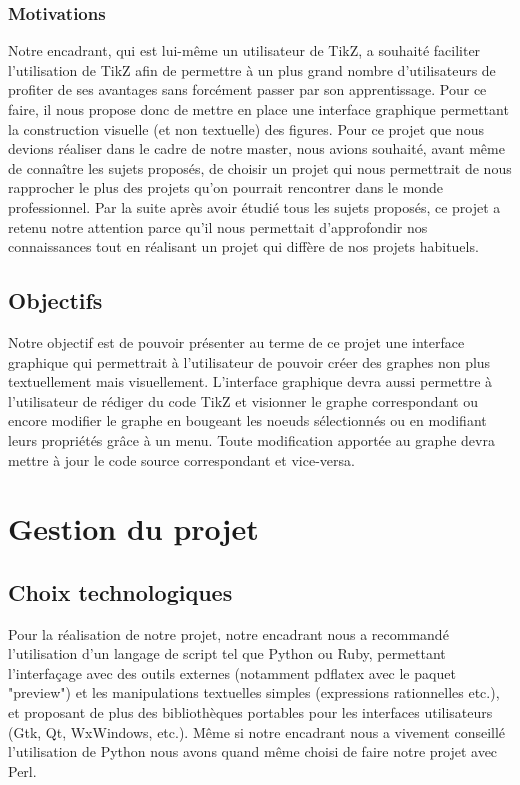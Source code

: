 \documentclass[a4paper]{report}
\begin{document}
  \subsection{Motivations}
  Notre encadrant, qui est lui-même un utilisateur de TikZ, a souhaité faciliter l'utilisation de TikZ afin de permettre à un plus grand nombre d'utilisateurs de profiter de ses avantages sans forcément passer par son apprentissage. Pour ce faire, il nous propose donc de mettre en place une interface graphique permettant la construction  visuelle (et non textuelle) des figures.
  \newline
  Pour ce projet que nous devions réaliser dans le cadre de notre master, nous avions souhaité, avant même de 
connaître les sujets proposés, de choisir un projet qui nous permettrait de nous rapprocher le plus des projets qu'on pourrait rencontrer dans le monde professionnel. Par la suite après avoir étudié tous les sujets proposés, ce projet a retenu notre attention parce qu'il nous permettait d'approfondir nos connaissances tout en réalisant un projet qui diffère de nos projets habituels.
  \section{Objectifs}
  Notre objectif est de pouvoir présenter au terme de ce projet une interface graphique qui permettrait à l'utilisateur de pouvoir créer des graphes non plus textuellement mais visuellement. L'interface graphique devra aussi permettre à l'utilisateur de rédiger du code TikZ et visionner le graphe correspondant ou encore modifier le graphe en bougeant les noeuds sélectionnés ou en modifiant leurs propriétés grâce à un menu.
Toute modification apportée au graphe devra mettre à jour le code source correspondant et vice-versa. 
  \chapter {Gestion du projet}

  \section{Choix technologiques}
  Pour la réalisation de notre projet, notre encadrant nous a recommandé l'utilisation d'un langage de script tel que Python ou Ruby, permettant l'interfaçage avec des outils externes (notamment pdflatex avec le paquet "preview") et les manipulations textuelles simples (expressions rationnelles etc.), et proposant de plus des bibliothèques portables pour les interfaces utilisateurs (Gtk, Qt, WxWindows, etc.). Même si notre encadrant nous a vivement conseillé l'utilisation de Python nous avons quand même choisi de faire notre projet avec Perl. 
\end{document}
